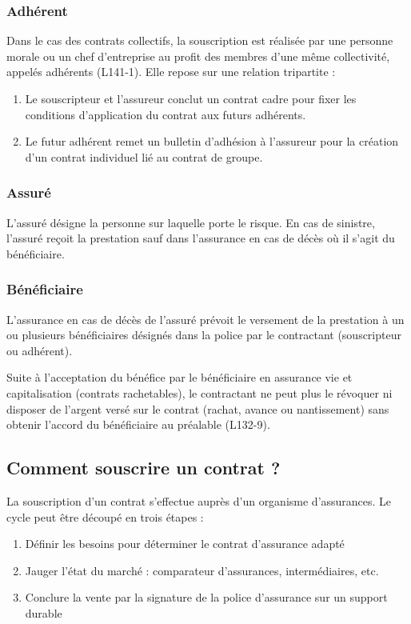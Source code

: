 \documentclass{article}
\begin{document}
\subsubsection{Adhérent}
Dans le cas des contrats collectifs, la souscription est réalisée par une personne morale ou un chef d'entreprise au profit des membres d'une même collectivité, appelés adhérents (L141-1). Elle repose sur une relation tripartite :
\begin{enumerate}
    \item Le souscripteur et l'assureur conclut un contrat cadre pour fixer les conditions d'application du contrat aux futurs adhérents.
    \item Le futur adhérent remet un bulletin d'adhésion à l'assureur pour la création d'un contrat individuel lié au contrat de groupe.
\end{enumerate}

\subsubsection{Assuré}
L'assuré désigne la personne sur laquelle porte le risque. En cas de sinistre, l'assuré reçoit la prestation sauf dans l'assurance en cas de décès où il s'agit du bénéficiaire.

\subsubsection{Bénéficiaire}
L'assurance en cas de décès de l'assuré prévoit le versement de la prestation à un ou plusieurs bénéficiaires désignés dans la police par le contractant (souscripteur ou adhérent).

Suite à l'acceptation du bénéfice par le bénéficiaire en assurance vie et capitalisation (contrats rachetables), le contractant ne peut plus le révoquer ni disposer de l'argent versé sur le contrat (rachat, avance ou nantissement) sans obtenir l'accord du bénéficiaire au préalable (L132-9).

\subsection{Comment souscrire un contrat ?}
La souscription d'un contrat s'effectue auprès d'un organisme d'assurances. Le cycle peut être découpé en trois étapes :
\begin{enumerate}
    \item Définir les besoins pour déterminer le contrat d'assurance adapté
    \item Jauger l'état du marché : comparateur d'assurances, intermédiaires, etc.
    \item Conclure la vente par la signature de la police d'assurance sur un support durable
\end{enumerate}
\end{document}
